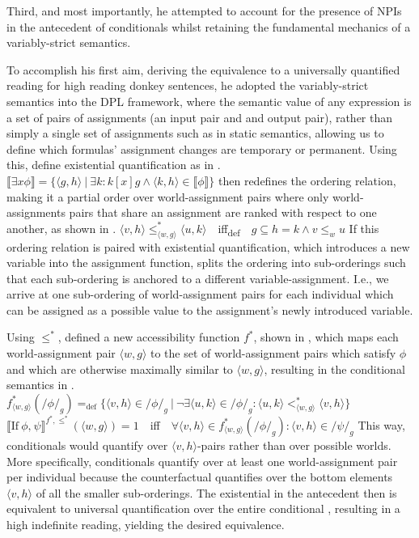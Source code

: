 Third, and most importantly, he attempted to account for the presence of NPIs in the antecedent of conditionals whilst retaining the fundamental mechanics of a variably-strict semantics. 

To accomplish his first aim, deriving the equivalence to a universally quantified reading for high reading donkey sentences, he adopted the variably-strict semantics into the DPL framework, where the semantic value of any expression is a set of pairs of assignments (an input pair and and output pair), rather than simply a single set of assignments such as in static semantics, allowing us to define which formulas' assignment changes are temporary or permanent. Using this, \textcite{Groenendijk1991} define existential quantification as in .
\ex{}
$\llbracket\exists x\phi\rrbracket=\{\langle g,h\rangle~|~\exists k:k[x]g\land\langle k,h\rangle\in\llbracket\phi\rrbracket\}$
\xe
\textcite{vanRooij2006} then redefines the ordering relation, making it a partial order over world-assignment pairs where only world-assignments pairs that share an assignment are ranked with respect to one another, as shown in .
\ex{}
{}
$\langle v,h\rangle\leqslant^*_{\langle w,g\rangle}\langle u,k\rangle$~~iff\textsubscript{def}~~$g\subseteq h=k\land v\leqslant_w u$
\xe
If this ordering relation is paired with existential quantification, which introduces a new variable into the assignment function, splits the ordering into sub-orderings such that each sub-ordering is anchored to a different variable-assignment. I.e., we arrive at one sub-ordering of world-assignment pairs for each individual which can be assigned as a possible value to the assignment's newly introduced variable.

Using $\leqslant^*$, \textcite{vanRooij2006} defined a new accessibility function $f^*$, shown in , which maps each world-assignment pair $\langle w,g\rangle$ to the set of world-assignment pairs which satisfy $\phi$ and which are otherwise maximally similar to $\langle w,g\rangle$, resulting in the conditional semantics in .
\pex[nopreamble=true]%
\a{} $f^*_{\langle w,g\rangle}(/\phi/_g)=_\text{def}\{\langle v,h\rangle\in/\phi/_g~|~\neg\exists\langle u,k\rangle\in/\phi/_g:\langle u,k\rangle<^*_{\langle w,g\rangle}\langle v,h\rangle\}$
\a{} $\llbracket\text{If}~\phi\text{,}~\psi\rrbracket^{f^*,\leqslant^*}(\langle w,g\rangle)=1$~~iff~~$\forall\langle v,h\rangle\in f^*_{\langle w,g\rangle}(/\phi/_g):\langle v,h\rangle\in/\psi/_g$
\xe
This way, conditionals would quantify over $\langle v,h\rangle$-pairs rather than over possible worlds. More specifically, conditionals quantify over at least one world-assignment pair per individual because the counterfactual quantifies over the bottom elements $\langle v,h\rangle$ of all the smaller sub-orderings. The existential in the antecedent then is equivalent to universal quantification over the entire conditional \parencite[see][]{Schubert1987}, resulting in a high indefinite reading, yielding the desired equivalence.

